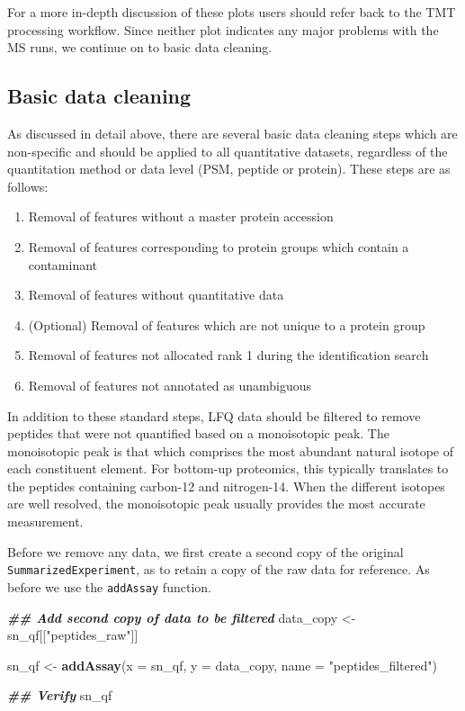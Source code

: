 \documentclass[9pt,a4paper,]{extarticle}
\newenvironment{Shaded}{\begin{snugshade}}{\end{snugshade}}
\newcommand{\AttributeTok}[1]{\textcolor[rgb]{0.13,0.29,0.53}{#1}}
\newcommand{\DocumentationTok}[1]{\textcolor[rgb]{0.56,0.35,0.01}{\textbf{\textit{#1}}}}
\newcommand{\FunctionTok}[1]{\textcolor[rgb]{0.13,0.29,0.53}{\textbf{#1}}}
\newcommand{\NormalTok}[1]{#1}
\newcommand{\OtherTok}[1]{\textcolor[rgb]{0.56,0.35,0.01}{#1}}
\newcommand{\StringTok}[1]{\textcolor[rgb]{0.31,0.60,0.02}{#1}}
\begin{document}
For a more in-depth discussion of these plots users should refer back to the TMT
processing workflow. Since neither plot indicates any major problems with the MS
runs, we continue on to basic data cleaning.

\hypertarget{basic-data-cleaning-1}{%
\subsection{Basic data cleaning}\label{basic-data-cleaning-1}}

As discussed in detail above, there are several basic data cleaning steps which
are non-specific and should be applied to all quantitative datasets, regardless
of the quantitation method or data level (PSM, peptide or protein). These steps
are as follows:

\begin{enumerate}
\def\labelenumi{\arabic{enumi}.}
\item
  Removal of features without a master protein accession
\item
  Removal of features corresponding to protein groups which contain a
  contaminant
\item
  Removal of features without quantitative data
\item
  (Optional) Removal of features which are not unique to a protein group
\item
  Removal of features not allocated rank 1 during the identification search
\item
  Removal of features not annotated as unambiguous
\end{enumerate}

In addition to these standard steps, LFQ data should be filtered to remove
peptides that were not quantified based on a monoisotopic peak. The monoisotopic
peak is that which comprises the most abundant natural isotope of each
constituent element. For bottom-up proteomics, this typically translates to the
peptides containing carbon-12 and nitrogen-14. When the different isotopes are
well resolved, the monoisotopic peak usually provides the most accurate
measurement.

Before we remove any data, we first create a second copy of the original
\texttt{SummarizedExperiment}, as to retain a copy of the raw data for reference. As
before we use the \texttt{addAssay} function.

\begin{Shaded}
\begin{Highlighting}[]
\DocumentationTok{\#\# Add second copy of data to be filtered}
\NormalTok{data\_copy }\OtherTok{\textless{}{-}}\NormalTok{ sn\_qf[[}\StringTok{"peptides\_raw"}\NormalTok{]]}

\NormalTok{sn\_qf }\OtherTok{\textless{}{-}} \FunctionTok{addAssay}\NormalTok{(}\AttributeTok{x =}\NormalTok{ sn\_qf,}
                  \AttributeTok{y =}\NormalTok{ data\_copy, }
                  \AttributeTok{name =} \StringTok{"peptides\_filtered"}\NormalTok{)}

\DocumentationTok{\#\# Verify}
\NormalTok{sn\_qf}
\end{Highlighting}
\end{Shaded}
\end{document}
